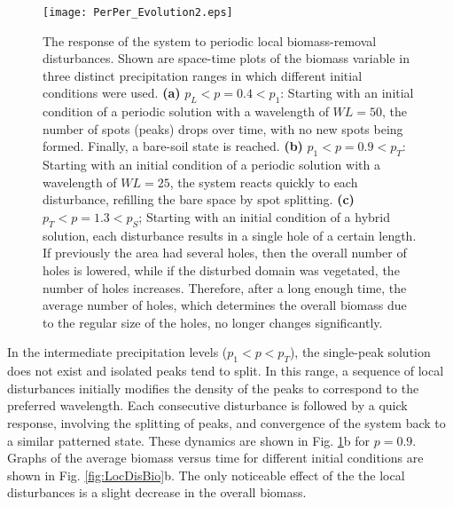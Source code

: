 \documentclass[aps,prl,preprint,superscriptaddress,floatfix]{revtex4-1}
\begin{document}
\begin{figure}
  \texttt{[image: PerPer\_Evolution2.eps]}
  \caption{The response of the system to periodic local biomass-removal disturbances. Shown are space-time plots of the biomass variable in three distinct precipitation ranges in which different initial conditions were used. 
 \textbf{(a)} $p_L<p=0.4<p_1$: Starting with an initial condition of a periodic solution with a wavelength of $WL=50$, the number of spots (peaks) drops over time, with no new spots being formed. Finally, a bare-soil state is reached. 
 \textbf{(b)} $p_1<p=0.9<p_T$: Starting with an initial condition of a periodic solution with a wavelength of $WL=25$, the system reacts quickly to each disturbance, refilling the bare space by spot splitting. 
 \textbf{(c)} $p_T<p=1.3<p_S$; Starting with an initial condition of a hybrid solution, each disturbance results in a single hole of a certain length.
 If previously the area had several holes, then the overall number of holes is lowered, while if the disturbed domain was vegetated, the number of holes increases. 
 Therefore, after a long enough time, the average number of holes, which determines the overall biomass due to the regular size of the holes, no longer changes significantly.\label{fig:LocDisEvo}
}
\end{figure}

In the intermediate precipitation levels ($p_1<p<p_T$), the single-peak solution does not exist and isolated peaks tend to split.
In this range, a sequence of local disturbances initially modifies the density of the peaks to correspond to the preferred wavelength.
Each consecutive disturbance is followed by a quick response, involving the splitting of peaks, and convergence of the system back to a similar patterned state.
These dynamics are shown in Fig. \ref{fig:LocDisEvo}b for $p=0.9$. 
Graphs of the average biomass versus time for different initial conditions are shown in Fig. \ref{fig:LocDisBio}b. 
The only noticeable effect of the the local disturbances is a slight decrease in the overall biomass.
\end{document}
